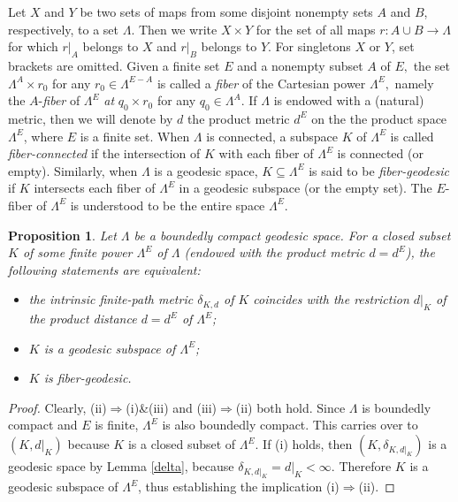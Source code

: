 \documentclass[11pt,a4paper]{amsart}
\newtheorem{proposition}{Proposition}
\theoremstyle{definition}
\numberwithin{equation}{section}
\begin{document}
Let $X$ and $Y$ be two sets of maps from some disjoint nonempty sets $A$ and $B$, respectively, to  a set $\Lambda$. Then we write $X\times Y$ for
the set of all maps $r:A\cup B\rightarrow \Lambda$ for which $r|_A$ belongs to $X$ and $r|_B$ belongs to $Y.$ For singletons $X$ or $Y$, set brackets
are omitted. Given a finite set $E$ and a nonempty subset $A$ of $E,$ the set $\Lambda^A\times r_0$ for any $r_0\in \Lambda^{E-A}$ is called a {\it fiber}
of the Cartesian power $\Lambda^E,$ namely the $A$-{\it fiber} of $\Lambda^E$ {\it at} $q_0\times r_0$ for any $q_0\in \Lambda^A.$ If $\Lambda$ is endowed
with a (natural) metric, then we will denote by $d$ the product metric $d^E$ on the the product space $\Lambda^E$, where $E$ is a finite set. When $\Lambda$
is connected, a subspace $K$ of $\Lambda^E$ is called {\it fiber-connected} if the intersection of $K$ with each fiber of $\Lambda^E$ is
connected (or empty). Similarly, when $\Lambda$ is a geodesic space, $K\subseteq \Lambda^E$ is said to be {\it fiber-geodesic} if $K$
intersects each fiber of $\Lambda^E$ in a geodesic subspace (or the empty set). The $E$-fiber of $\Lambda^E$ is understood to be the entire space $\Lambda^E$.


\begin{proposition} \label{fiber-isometric} Let $\Lambda$ be a boundedly compact geodesic space. For a closed subset $K$ of some finite power ${\Lambda}^E$
of $\Lambda$ (endowed with the product metric $d=d^E$), the following statements are equivalent:

\begin{itemize}
\item[\rm(i)] the intrinsic finite-path metric $\delta_{{K},d}$ of $K$ coincides with the restriction $d|_{K}$
of the product distance $d=d^E$ of ${\Lambda}^E$;
\item[\rm(ii)] ${K}$ is a geodesic subspace of ${\Lambda}^E$;
\item[\rm(iii)] ${K}$ is fiber-geodesic.
\end{itemize}
\end{proposition}

\begin{proof} Clearly, (ii)$\Rightarrow$(i)\&(iii)  and (iii)$\Rightarrow$(ii) both hold. Since $\Lambda$ is boundedly compact and
$E$ is finite, ${\Lambda}^E$ is also boundedly compact. This carries over to $({K},d|_{K})$ because $K$ is a closed subset
of ${\Lambda}^E$.   If (i) holds, then $(K,\delta_{{K},d|_{K}})$ is a geodesic
space by Lemma \ref{delta}, because  $\delta_{{K},d|_{K}}=d|_{K}<\infty$.  %
Therefore $K$ is a geodesic subspace of ${\Lambda}^E$, thus establishing the implication (i)$\Rightarrow$(ii).
\end{proof}
\end{document}
